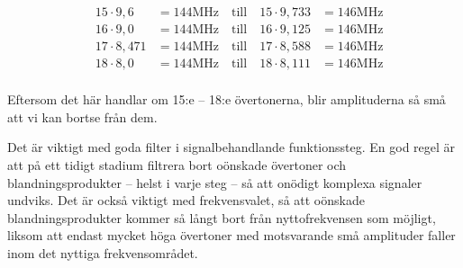 \begin{align*}
  &15 \cdot 9,6   &= 144 \text{MHz} \quad \text{till} \quad 15 \cdot 9,733 &= 146 \text{MHz} \\
  &16 \cdot 9,0   &= 144 \text{MHz} \quad \text{till} \quad 16 \cdot 9,125 &= 146 \text{MHz} \\
  &17 \cdot 8,471 &= 144 \text{MHz} \quad \text{till} \quad 17 \cdot 8,588 &= 146 \text{MHz} \\
  &18 \cdot 8,0   &= 144 \text{MHz} \quad \text{till} \quad 18 \cdot 8,111 &= 146 \text{MHz} \\
\end{align*}

Eftersom det här handlar om 15:e -- 18:e övertonerna, blir amplituderna så små
att vi kan bortse från dem.

Det är viktigt med goda filter i signalbehandlande funktionssteg.
En god regel är att på ett tidigt stadium filtrera bort oönskade
övertoner och blandningsprodukter -- helst i varje steg -- så att
onödigt komplexa signaler undviks.
Det är också viktigt med frekvensvalet, så att oönskade blandningsprodukter
kommer så långt bort från nyttofrekvensen som möjligt, liksom att endast mycket
höga övertoner med motsvarande små amplituder faller inom det nyttiga
frekvensområdet.
